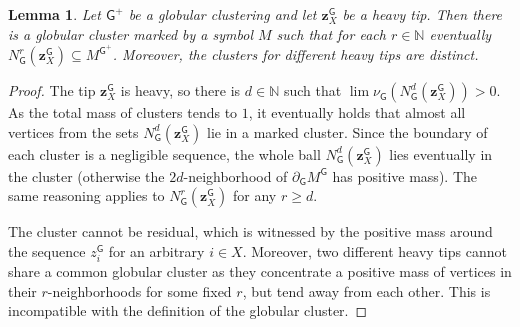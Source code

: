 \documentclass[11pt]{article}
\theoremstyle{plain}
\newtheorem{lemma}[theorem]{Lemma}
\theoremstyle{definition}
\theoremstyle{remark}
\newcommand{\N}{\mathbb{N}}
\newcommand{\strseq}[1]{{\boldsymbol{\mathsf{#1}}}}
\newcommand{\tpl}[1]{{\bm{#1}}}
\begin{document}
\begin{lemma}\label{lem:default_clustering_of_gadgets}
    Let $\strseq{G}^+$ be a globular clustering and let $\tpl{z}^\strseq{G}_X$ be a heavy tip.
    Then there is a globular cluster marked by a symbol $M$ such that for each $r \in \N$ eventually $N_\strseq{G}^r(\tpl{z}^\strseq{G}_X) \subseteq M^{\strseq{G}^+}$.
    Moreover, the clusters for different heavy tips are distinct.
\end{lemma}
\begin{proof}
    The tip $\tpl{z}^\strseq{G}_X$ is heavy, so there is $d \in \N$ such that $\lim \nu_\strseq{G}(N^d_\strseq{G}(\tpl{z}^\strseq{G}_X)) > 0$.
    As the total mass of clusters tends to $1$, it eventually holds that almost all vertices from the sets $N^d_\strseq{G}(\tpl{z}^\strseq{G}_X)$ lie in a marked cluster.
    Since the boundary of each cluster is a negligible sequence, the whole ball $N^d_\strseq{G}(\tpl{z}^\strseq{G}_X)$ lies eventually in the cluster (otherwise the $2d$-neighborhood of $\partial_\strseq{G} M^\strseq{G}$ has positive mass).
    The same reasoning applies to $N^r_\strseq{G}(\tpl{z}^\strseq{G}_X)$ for any $r \geq d$.
    
    The cluster cannot be residual, which is witnessed by the positive mass around the sequence $z_i^\strseq{G}$ for an arbitrary $i \in X$.
    Moreover, two different heavy tips cannot share a common globular cluster as they concentrate a positive mass of vertices in their $r$-neighborhoods for some fixed $r$, but tend away from each other.
    This is incompatible with the definition of the globular cluster.
\end{proof}
\end{document}
